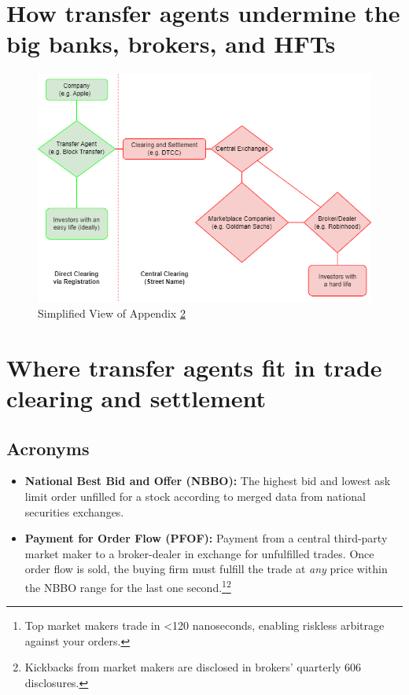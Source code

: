 \documentclass[11pt, english]{article}
\begin{document}
\pagebreak
\begin{multicols}{2}

\footnotesize{
    
    
}

\end{multicols}

\appendix



\section{How transfer agents undermine the big banks, brokers, and HFTs}

\begin{figure}[H]
    \centering
    \includegraphics[width=400pt]{ownership-simplified.png}
    \caption{Simplified View of Appendix \ref{appendix-b}}
\end{figure}
\pagebreak



\section{Where transfer agents fit in trade clearing and settlement}\label{appendix-b}


\subsection*{Acronyms}

\begin{itemize}
  \item \textbf{National Best Bid and Offer (NBBO):} The highest bid and lowest ask limit order unfilled for a stock according to merged data from national securities exchanges.
  
  \item \textbf{Payment for Order Flow (PFOF):} Payment from a central third-party market maker to a broker-dealer in exchange for unfulfilled trades. Once order flow is sold, the buying firm must fulfill the trade at \textit{any} price within the NBBO range for the last one second.\footnote{Top market makers trade in <120 nanoseconds, enabling riskless arbitrage against your orders.}\footnote{Kickbacks from market makers are disclosed in brokers' quarterly 606 disclosures.}
\end{itemize}
\end{document}
